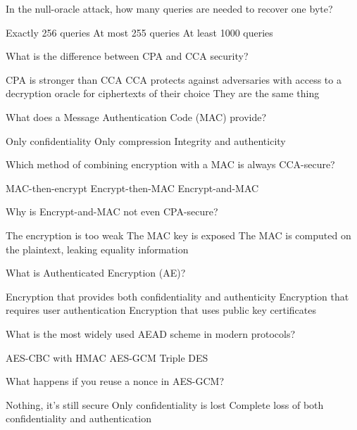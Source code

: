 \documentclass[10pt,a4paper,american]{exam}
\begin{document}
\begin{questions}
	\question In the null-oracle attack, how many queries are needed to recover one byte?
	\begin{randomizechoices}
		\choice Exactly 256 queries
		\CorrectChoice At most 255 queries
		\choice At least 1000 queries
	\end{randomizechoices}

	\question What is the difference between CPA and CCA security?
	\begin{randomizechoices}
		\choice CPA is stronger than CCA
		\CorrectChoice CCA protects against adversaries with access to a decryption oracle for ciphertexts of their choice
		\choice They are the same thing
	\end{randomizechoices}

	\question What does a Message Authentication Code (MAC) provide?
	\begin{randomizechoices}
		\choice Only confidentiality
		\choice Only compression
		\CorrectChoice Integrity and authenticity
	\end{randomizechoices}

	\question Which method of combining encryption with a MAC is always CCA-secure?
	\begin{randomizechoices}
		\choice MAC-then-encrypt
		\CorrectChoice Encrypt-then-MAC
		\choice Encrypt-and-MAC
	\end{randomizechoices}

	\question Why is Encrypt-and-MAC not even CPA-secure?
	\begin{randomizechoices}
		\choice The encryption is too weak
		\choice The MAC key is exposed
		\CorrectChoice The MAC is computed on the plaintext, leaking equality information
	\end{randomizechoices}

	\question What is Authenticated Encryption (AE)?
	\begin{randomizechoices}
		\CorrectChoice Encryption that provides both confidentiality and authenticity
		\choice Encryption that requires user authentication
		\choice Encryption that uses public key certificates
	\end{randomizechoices}

	\question What is the most widely used AEAD scheme in modern protocols?
	\begin{randomizechoices}
		\choice AES-CBC with HMAC
		\CorrectChoice AES-GCM
		\choice Triple DES
	\end{randomizechoices}

	\question What happens if you reuse a nonce in AES-GCM?
	\begin{randomizechoices}
		\choice Nothing, it's still secure
		\choice Only confidentiality is lost
		\CorrectChoice Complete loss of both confidentiality and authentication
	\end{randomizechoices}


\end{questions}
\end{document}
